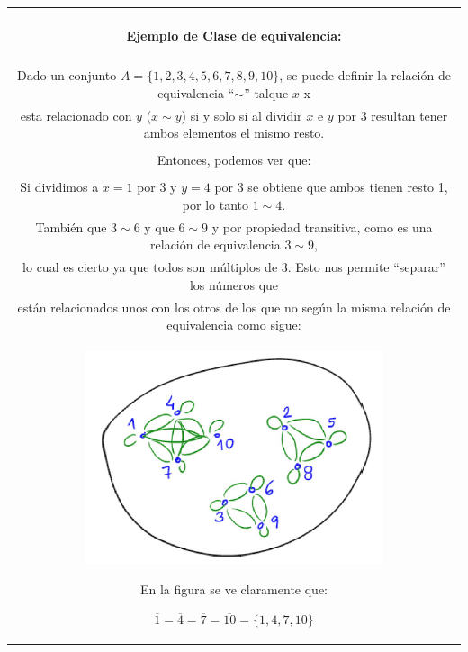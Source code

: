 \documentclass[10pt]{article}
\begin{document}
\begin{table}[H]
	\begin{tabular}{||c||}
	\hline \\
	\sffamily
	\begin{Large}
		\textbf{\textcolor{B}{Ejemplo de Clase de equivalencia:}}
	\end{Large}
		
	\\\\		
	\sffamily Dado un conjunto $A = \{ 1,2,3,4,5,6,7,8,9,10 \}$, se puede definir la relación de equivalencia ``$\sim$'' talque $x$ x \\ \sffamily  esta relacionado con $y$ ($x \sim y$) si y solo si al dividir $x$ e $y$ por 3 resultan tener ambos elementos el mismo resto. 
	\\\\ Entonces, podemos ver que: \\\\ Si dividimos a $x=1$ por 3 y $y=4$ por 3 
	se obtiene que ambos tienen resto 1, por lo tanto $1 \sim 4$. \\ También que $3 \sim 6$ y que $6 \sim 9$ y por propiedad transitiva, como es una relación de equivalencia $3 \sim 9$,\\ lo cual es cierto ya que todos son múltiplos de 3.  Esto nos permite ``separar'' los números que\\ están relacionados unos con los otros de los que no según la misma relación de equivalencia como sigue:\\ 
			\begin{minipage}[b]{0.4\linewidth}
				\centering
		 		\includegraphics[scale=0.7]{figuras/relaciones/img1.png}
			\end{minipage}	 	
			\begin{minipage}[b]{0.6\linewidth}	
				En la figura se ve claramente que: 
				
				$\overline{1}=\overline{4}=\overline{7}=\overline{10}=\{1,4,7,10\}$
				

\end{minipage}
\end{tabular}
\end{table}
\end{document}
